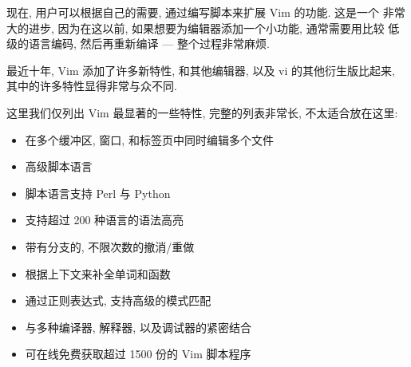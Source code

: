 现在, 用户可以根据自己的需要, 通过编写脚本来扩展 Vim 的功能. 这是一个
非常大的进步, 因为在这以前, 如果想要为编辑器添加一个小功能, 通常需要用比较
低级的语言编码, 然后再重新编译 --- 整个过程非常麻烦.

最近十年, Vim 添加了许多新特性, 和其他编辑器, 以及 vi 的其他衍生版比起来,
其中的许多特性显得非常与众不同.

这里我们仅列出 Vim 最显著的一些特性, 完整的列表非常长, 不太适合放在这里:
\begin{itemize}
    \item 在多个缓冲区, 窗口, 和标签页中同时编辑多个文件
    \item 高级脚本语言
    \item 脚本语言支持 Perl 与 Python
    \item 支持超过 200 种语言的语法高亮
    \item 带有分支的, 不限次数的撤消/重做
    \item 根据上下文来补全单词和函数
    \item 通过正则表达式, 支持高级的模式匹配
    \item 与多种编译器, 解释器, 以及调试器的紧密结合
    \item 可在线免费获取超过 1500 份的 Vim 脚本程序
\end{itemize}
